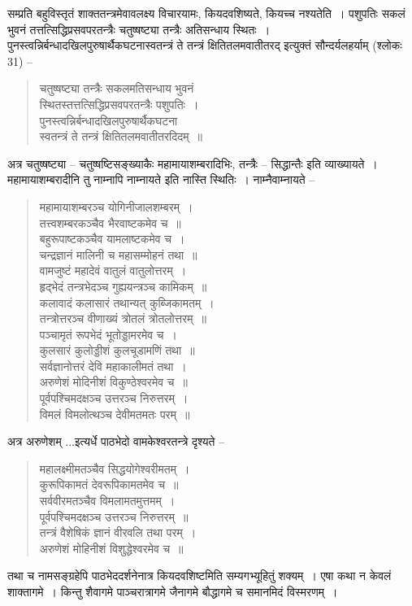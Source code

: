 {सम्प्रति बहुविस्तृतं शाक्ततन्त्रमेवावलक्ष्य विचारयामः, कियदवशिष्यते, कियच्च नश्यतेति~। पशुपतिः सकलं भुवनं तत्तत्सिद्धिप्रसवपरतन्त्रैः चतुष्षष्ट्या तन्त्रैः अतिसन्धाय स्थितः~। पुनस्त्वन्निर्बन्धादखिलपुरुषार्थैकघटनास्वतन्त्रं ते तन्त्रं क्षितितलमवातीतरद् इत्युक्तं सौन्दर्यलहर्याम् (श्लोकः 31) –
\begin{verse}
चतुष्षष्ट्या तन्त्रैः सकलमतिसन्धाय भुवनं \\
स्थितस्तत्तत्सिद्धिप्रसवपरतन्त्रैः पशुपतिः~। \\
पुनस्त्वन्निर्बन्धादखिलपुरुषार्थैकघटना \\
स्वतन्त्रं ते तन्त्रं क्षितितलमवातीतरदिदम्~॥ 
\end{verse}
अत्र चतुष्षष्ट्या – चतुष्षष्टिसङ्ख्याकैः महामायाशम्बरादिभिः, तन्त्रैः – सिद्धान्तैः इति व्याख्यायते~। महामायाशम्बरादीनि तु नाम्नापि नाम्नायते इति नास्ति स्थितिः~। नाम्नैवाम्नायते –
\begin{verse}
महामायाशम्बरञ्च योगिनीजालशम्बरम्~। \\
तत्त्वशम्बरकञ्चैव भैरवाष्टकमेव च~॥ \\
बहुरूपाष्टकञ्चैव यामलाष्टकमेव च~। \\
चन्द्रज्ञानं मालिनी च महासम्मोहनं तथा~॥ \\
वामजुष्टं महादेवं वातुलं वातुलोत्तरम्~। \\
हृद्भेदं तन्त्रभेदञ्च गुह्ययन्त्रञ्च कामिकम्~॥ \\
कलावादं कलासारं तथान्यत् कुब्जिकामतम्~। \\
तन्त्रोत्तरञ्च वीणाख्यं त्रोतलं त्रोतलोत्तरम्~॥ \\
पञ्चामृतं रूपभेदं भूतोड्डामरमेव च~। \\
कुलसारं कुलोड्डीशं कुलचूडामणिं तथा~॥ \\
सर्वज्ञानोत्तरं देवि महाकालीमतं तथा~। \\
अरुणेशं मोदिनीशं विकुण्ठेश्वरमेव च~॥ \\
पूर्वपश्चिमदक्षञ्च उत्तरञ्च निरुत्तरम्~। \\
विमलं विमलोत्थञ्च देवीमतमतः परम्~॥ 
\end{verse}
अत्र अरुणेशम् ...इत्यर्धे पाठभेदो वामकेश्वरतन्त्रे दृश्यते –
\begin{verse}
महालक्ष्मीमतञ्चैव सिद्धयोगेश्वरीमतम्~। \\
कुरूपिकामतं देवरूपिकामतमेव च~॥ \\
सर्ववीरमतञ्चैव विमलामतमुत्तमम्~। \\
पूर्वपश्चिमदक्षञ्च उत्तरञ्च निरुत्तरम्~॥ \\
तन्त्रं वैशेषिकं ज्ञानं वीरवलि तथा परम्~। \\ 
अरुणेशं मोहिनीशं विशुद्धेश्वरमेव च~॥ 
\end{verse}
तथा च नामसङ्ग्रहेपि पाठभेददर्शनेनात्र कियदवशिष्टमिति सम्यगभ्यूहितुं शक्यम्~। एषा कथा न केवलं शाक्तागमे~। किन्तु शैवागमे पाञ्चरात्रागमे जैनागमे बौद्धागमे च समानमिदं विस्मरणम्~। 

}

